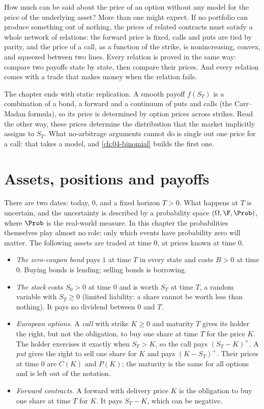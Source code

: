 
How much can be said about the price of an option without any model for the price of
the underlying asset? More than one might expect. If no portfolio can produce something
out of nothing, the prices of related contracts must satisfy a whole network of
relations: the forward price is fixed, calls and puts are tied by parity, and the price
of a call, as a function of the strike, is nonincreasing, convex, and squeezed between
two lines. Every relation is proved in the same way: compare two payoffs state by state, then
compare their prices. And every relation comes with a trade that makes money when the
relation fails.

The chapter ends with static replication. A smooth payoff $f(S_T)$ is a combination of a
bond, a forward and a continuum of puts and calls (the Carr--Madan formula), so its price
is determined by option prices across strikes. Read the other way, these prices determine
the distribution that the market implicitly assigns to $S_T$. What no-arbitrage arguments
cannot do is single out one price for a call: that takes a model, and
\cref{ch:04-binomial} builds the first one.

\section{Assets, positions and payoffs}\label{sec:arb-market}

There are two dates: today, $0$, and a fixed horizon $T>0$. What happens at $T$ is
uncertain, and the uncertainty is described by a probability space $(\Omega,\F,\Prob)$,
where $\Prob$ is the real-world measure. In this chapter the probabilities themselves play
almost no role: only which events have probability zero will matter. The following assets
are traded at time $0$, at prices known at time $0$.

\begin{itemize}
  \item \emph{The zero-coupon bond} pays $1$ at time $T$ in every state and costs $B>0$ at
    time $0$. Buying bonds is lending; selling bonds is borrowing.
  \item \emph{The stock} costs $S_0>0$ at time $0$ and is worth $S_T$ at time $T$, a random
    variable with $S_T\ge0$ (limited liability: a share cannot be worth less than nothing).
    It pays no dividend between $0$ and $T$.
  \item \emph{European options.} A \emph{call} with strike $K\ge0$ and maturity $T$ gives its
    holder the right, but not the obligation, to buy one share at time $T$ for the price $K$.
    The holder exercises it exactly when $S_T>K$, so the call pays $(S_T-K)^+$. A \emph{put}
    gives the right to sell one share for $K$ and pays $(K-S_T)^+$. Their prices at time $0$
    are $C(K)$ and $P(K)$; the maturity is the same for all options and is left out of the
    notation.
  \item \emph{Forward contracts.} A forward with delivery price $K$ is the obligation to buy
    one share at time $T$ for $K$. It pays $S_T-K$, which can be negative.
\end{itemize}


